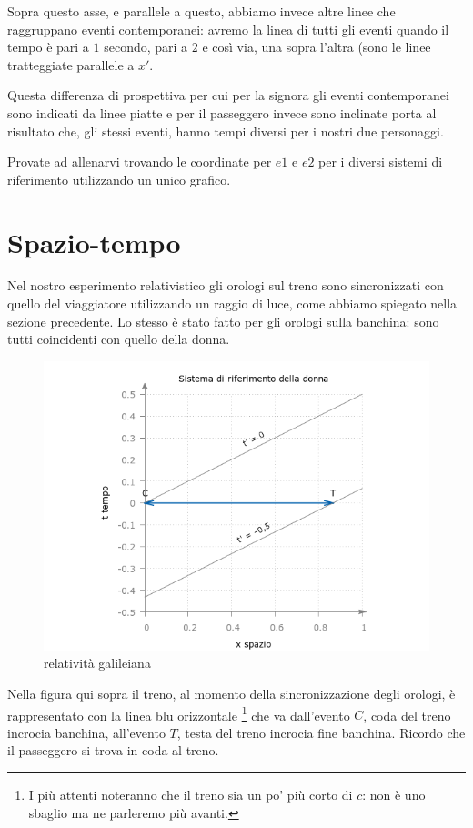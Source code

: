 Sopra questo asse, e parallele a questo, abbiamo invece altre linee che raggruppano eventi contemporanei: avremo la linea di tutti gli eventi quando il tempo è pari a $1$ secondo, pari a $2$ e così via, una sopra l'altra (sono le linee tratteggiate parallele a $x'$.

Questa differenza di prospettiva per cui per la signora gli eventi contemporanei sono indicati da linee piatte e per il passeggero invece sono inclinate porta al risultato che, gli stessi eventi, hanno tempi diversi per i nostri due personaggi.

Provate ad allenarvi trovando le coordinate per $e1$ e $e2$ per i diversi sistemi di riferimento utilizzando un unico grafico.


\section{Spazio-tempo}

Nel nostro esperimento relativistico gli orologi sul treno sono sincronizzati con quello del viaggiatore utilizzando un raggio di luce, come abbiamo spiegato nella sezione precedente. Lo stesso è stato fatto per gli orologi sulla banchina: sono tutti coincidenti con quello della donna.

\begin{figure}[h!]
 \centering
 \includegraphics[scale=0.7]{figure/fig9}
 \caption{relatività galileiana}
\end{figure}

Nella figura qui sopra il treno, al momento della sincronizzazione degli orologi, è rappresentato con la linea blu orizzontale \footnote{I più attenti noteranno che il treno sia un po' più corto di $c$: non è uno sbaglio ma ne parleremo più avanti.} che va dall'evento $C$, coda del treno incrocia banchina, all'evento $T$, testa del treno incrocia fine banchina. Ricordo che il passeggero si trova in coda al treno.

